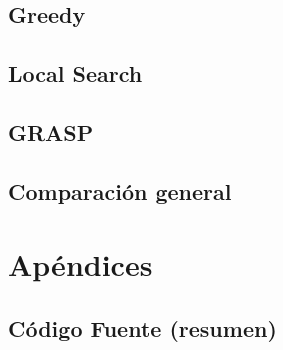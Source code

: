 \documentclass[12pt, a4paper, twoside]{article}
\begin{document}
\begin{TP3}
  \subsection{Greedy}\label{subsec:greedy}
  
  \newpage

  \subsection{Local Search}\label{subsec:local}
  
  \newpage

  \subsection{GRASP}\label{subsec:grasp}
  
  \newpage

  \subsection{Comparación general}\label{subsec:comparativa}
  
  
	
  \newpage
\section{Apéndices}\label{sec:apendices}
  
  \subsection{Código Fuente (resumen)}\label{subsec:codigo-fuente}
  
  \clearpage
  
  
% 


\end{TP3}
\end{document}
